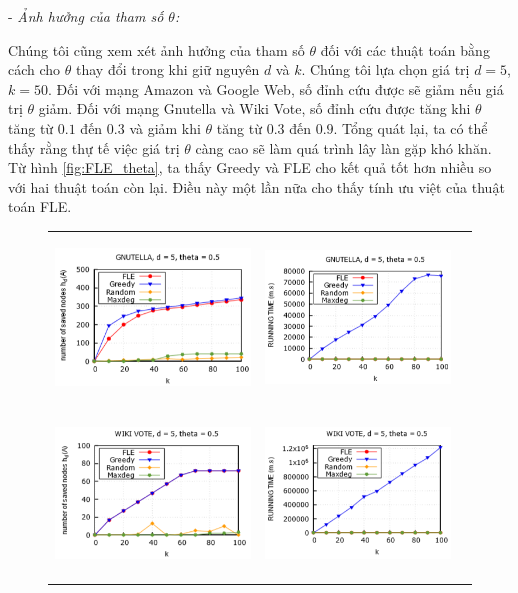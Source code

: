 - {\itshape Ảnh hưởng của tham số $\theta$:}

Chúng tôi cũng xem xét ảnh hưởng của tham số $\theta$ đối với các thuật toán bằng cách cho $\theta$ thay đổi trong khi giữ nguyên $d$ và $k$. Chúng tôi lựa chọn giá trị $d=5$, $k=50$. Đối với mạng Amazon và Google Web, số đỉnh cứu được sẽ giảm nếu giá trị $\theta$ giảm. Đối với mạng Gnutella và Wiki Vote, số đỉnh cứu được tăng khi $\theta$ tăng từ $0.1$ đến $0.3$ và giảm khi $\theta$ tăng từ $0.3$ đến $0.9$. Tổng quát lại, ta có thể thấy rằng thự tế việc giá trị $\theta$ càng cao sẽ làm quá trình lây làn gặp khó khăn. Từ hình \ref{fig:FLE_theta}, ta thấy Greedy và FLE cho kết quả tốt hơn nhiều so với hai thuật toán còn lại. Điều này một lần nữa cho thấy tính ưu việt của thuật toán FLE.

\begin{figure}
	\begin{tabular}{lll}
		\includegraphics[height = 4.4cm]{picture/FLE/gnu_res} &
		\includegraphics[height = 4.4cm]{picture/FLE/gnu_time} 
		\\
		\includegraphics[height = 4.4cm]{picture/FLE/wiki_res} &
		\includegraphics[height = 4.4cm]{picture/FLE/wiki_time} 

\end{tabular}
\end{figure}
